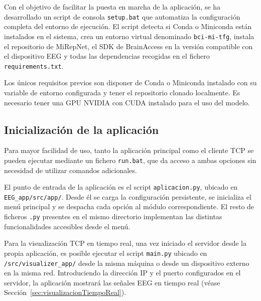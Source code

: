 Con el objetivo de facilitar la puesta en marcha de la aplicación, se ha desarrollado un script de consola \texttt{setup.bat} que automatiza la configuración completa del entorno de ejecución. El script detecta si Conda o Miniconda están instalados en el sistema, crea un entorno virtual denominado \texttt{bci-mi-tfg}, instala el repositorio de MiRepNet, el SDK de BrainAccess en la versión compatible con el dispositivo EEG y todas las dependencias recogidas en el fichero \texttt{requirements.txt}.

Los únicos requisitos previos son disponer de Conda o Miniconda instalado con su variable de entorno configurada y tener el repositorio clonado localmente. Es necesario tener una GPU NVIDIA con CUDA instalado para el uso del modelo. 

\subsection{Inicialización de la aplicación}
\label{subsec:inicializacion}
Para mayor facilidad de uso, tanto la aplicación principal como el cliente TCP se pueden ejecutar mediante un fichero \texttt{run.bat}, que da acceso a ambas opciones sin necesidad de utilizar comandos adicionales.

El punto de entrada de la aplicación es el script \texttt{aplicacion.py}, ubicado en \texttt{EEG\_app/src/app/}. Desde él se carga la configuración persistente, se inicializa el menú principal y se despacha cada opción al módulo correspondiente. El resto de ficheros \texttt{.py} presentes en el mismo directorio implementan las distintas funcionalidades accesibles desde el menú.

Para la visualización TCP en tiempo real, una vez iniciado el servidor desde la propia aplicación, es posible ejecutar el script \texttt{main.py} ubicado en \texttt{/src/visualizer\_app/} desde la misma máquina o desde un dispositivo externo en la misma red. Introduciendo la dirección IP y el puerto configurados en el servidor, la aplicación mostrará las señales EEG en tiempo real (véase Sección~\ref{sec:visualizacionTiempoReal}).
